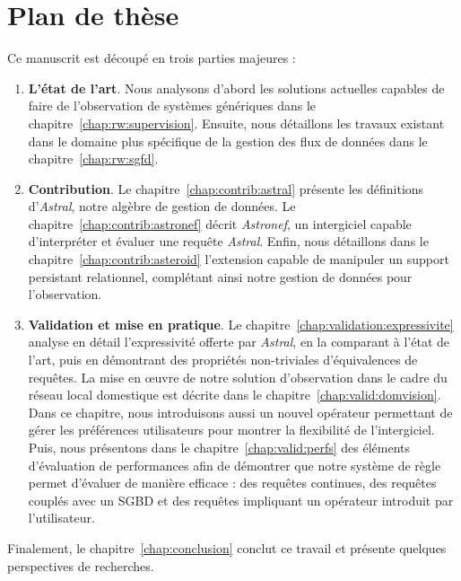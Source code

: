 \section{Plan de thèse}\label{sec:intro:plan}
Ce manuscrit est découpé en trois parties majeures :
\begin{enumerate}
\item \textbf{L'état de l'art}. Nous analysons d'abord les solutions actuelles capables de faire de l'observation de systèmes génériques dans le chapitre~\ref{chap:rw:supervision}. Ensuite, nous détaillons les travaux existant dans le domaine plus spécifique de la gestion des flux de données dans le chapitre~\ref{chap:rw:sgfd}.
\item \textbf{Contribution}. Le chapitre~\ref{chap:contrib:astral} présente les définitions d'\textit{Astral}, notre algèbre de gestion de données. Le chapitre~\ref{chap:contrib:astronef} décrit \textit{Astronef}, un intergiciel capable d'interpréter et évaluer une requête \textit{Astral}. Enfin, nous détaillons dans le chapitre~\ref{chap:contrib:asteroid} l'extension capable de manipuler un support persistant relationnel, complétant ainsi notre gestion de données pour l'observation.
\item \textbf{Validation et mise en pratique}. Le chapitre~\ref{chap:validation:expressivite} analyse en détail l'expressivité offerte par \textit{Astral}, en la comparant à l'état de l'art, puis en démontrant des propriétés non-triviales d'équivalences de requêtes. La mise en œuvre de notre solution d'observation dans le cadre du réseau local domestique est décrite dans le chapitre~\ref{chap:valid:domvision}. Dans ce chapitre, nous introduisons aussi un nouvel opérateur permettant de gérer les préférences utilisateurs pour montrer la flexibilité de l'intergiciel. Puis, nous présentons dans le chapitre~\ref{chap:valid:perfs} des éléments d'évaluation de performances afin de démontrer que notre système de règle permet d'évaluer de manière efficace : des requêtes continues, des requêtes couplés avec un SGBD et des requêtes impliquant un opérateur introduit par l'utilisateur.
\end{enumerate}

Finalement, le chapitre~\ref{chap:conclusion} conclut ce travail et présente quelques perspectives de recherches.